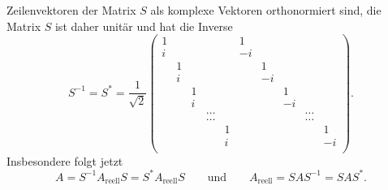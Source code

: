 Zeilenvektoren der Matrix $S$ als komplexe Vektoren orthonormiert sind,
die Matrix $S$ ist daher unitär und hat die Inverse
\[
S^{-1}
=
S^*
=
\frac{1}{\sqrt{2}}
\left(\begin{array}{ccccc|ccccc}
 1&  &  &     &  & 1&  &  &     &  \\
 i&  &  &     &  &-i&  &  &     &  \\
  & 1&  &     &  &  & 1&  &     &  \\
  & i&  &     &  &  &-i&  &     &  \\
  &  & 1&     &  &  &  & 1&     &  \\
  &  & i&     &  &  &  &-i&     &  \\
  &  &  &\dots&  &  &  &  &\dots&  \\
  &  &  &\dots&  &  &  &  &\dots&  \\
  &  &  &     & 1&  &  &  &     & 1\\
  &  &  &     & i&  &  &  &     &-i\\
\end{array}\right).
\]
Insbesondere folgt jetzt
\[
A
=
S^{-1}A_{\text{reell}}S
=
S^*A_{\text{reell}}S
\qquad\text{und}\qquad
A_{\text{reell}}
=
SAS^{-1}
=
SAS^*.
\]




